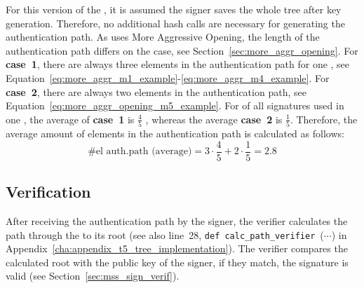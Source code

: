 For this version of the \extree, it is assumed the signer saves the whole tree  after key generation. Therefore, no additional hash calls are necessary for generating the authentication path. %
As \extree uses More Aggressive Opening, the length of the authentication path differs on the case, see Section~\ref{sec:more_aggr_opening}.
For \textbf{case~1}, there are always three elements in the authentication path for one \tfblock, see Equation~\ref{eq:more_aggr_m1_example}-\ref{eq:more_aggr_m4_example}.
For \textbf{case~2}, there are always two elements in the authentication path, see Equation~\ref{eq:more_aggr_opening_m5_example}. For of all signatures used in one \extree, the average of \textbf{case~1} is $\frac{4}{5}$ , whereas the average \textbf{case~2} is $\frac{1}{5}$.
Therefore, the average amount of elements in the authentication path is calculated as follows:
\begin{equation}
\label{eq:more_aggr_len_authpath}
\text{\# el auth.path (average)} = 3 \cdot \frac{4}{5} + 2 \cdot \frac{1}{5} = 2.8
\end{equation}





\subsection{\texorpdfstring{\extree}{Ext. T5-Tree} Verification}
After receiving the authentication path by the signer, the verifier calculates the path through the \extree to its root (see also line~28, \texttt{def calc_path_verifier}~($\cdots$) in Appendix~\ref{cha:appendix_t5_tree_implementation}). The verifier compares the calculated root with the public key of the signer, if they match, the signature is valid (see Section~\ref{sec:mss_sign_verif}).

